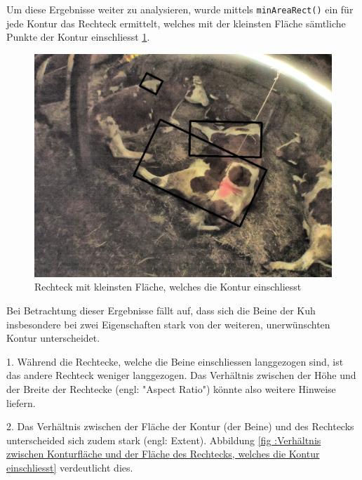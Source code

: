 Um diese Ergebnisse weiter zu analysieren, wurde mittels \texttt{minAreaRect()} ein für jede Kontur das Rechteck ermittelt, welches mit der kleinsten Fläche sämtliche Punkte der Kontur einschliesst \ref{fig: Rechteck mit kleinsten Fläche, welches die Kontur einschliesst}.  
\begin{figure}[H]
	\center
	\includegraphics[scale=0.43]{Grafiken/entwicklung/23ShapeAnalysis.jpg}
	\caption{Rechteck mit kleinsten Fläche, welches die Kontur einschliesst} 
	\label{fig: Rechteck mit kleinsten Fläche, welches die Kontur einschliesst} 
\end{figure}

Bei Betrachtung dieser Ergebnisse fällt auf, dass sich die Beine der Kuh insbesondere bei zwei Eigenschaften stark von der weiteren, unerwünschten Kontur unterscheidet. 

1. Während die Rechtecke, welche die Beine einschliessen langgezogen sind, ist das andere Rechteck weniger langgezogen. Das Verhältnis zwischen der Höhe und der Breite der Rechtecke (engl: "Aspect Ratio") könnte also weitere Hinweise liefern.

2. Das Verhältnis zwischen der Fläche der Kontur (der Beine) und des Rechtecks unterscheided sich zudem stark (engl: Extent). Abbildung \ref{fig :Verhältnis zwischen Konturfläche und der Fläche des Rechtecks, welches die Kontur einschliesst} verdeutlicht dies.


